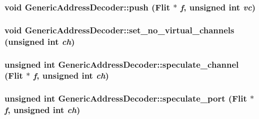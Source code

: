 \hypertarget{classGenericAddressDecoder_8a2cc1c7e48dbbf11b03c49a3ce3e1d9}{
\subsubsection[{push}]{\setlength{\rightskip}{0pt plus 5cm}void GenericAddressDecoder::push ({\bf Flit} $\ast$ {\em f}, \/  unsigned int {\em vc})}}
\label{classGenericAddressDecoder_8a2cc1c7e48dbbf11b03c49a3ce3e1d9}


\hypertarget{classGenericAddressDecoder_8473f733b74bc46dbcda7a5a4cdd4420}{
\subsubsection[{set\_\-no\_\-virtual\_\-channels}]{\setlength{\rightskip}{0pt plus 5cm}void GenericAddressDecoder::set\_\-no\_\-virtual\_\-channels (unsigned int {\em ch})}}
\label{classGenericAddressDecoder_8473f733b74bc46dbcda7a5a4cdd4420}


\hypertarget{classGenericAddressDecoder_81457cd722fd50e8297078e0729ea6b5}{
\subsubsection[{speculate\_\-channel}]{\setlength{\rightskip}{0pt plus 5cm}unsigned int GenericAddressDecoder::speculate\_\-channel ({\bf Flit} $\ast$ {\em f}, \/  unsigned int {\em ch})}}
\label{classGenericAddressDecoder_81457cd722fd50e8297078e0729ea6b5}


\hypertarget{classGenericAddressDecoder_d7d7f4cb63e720fd70d886eb6d11e812}{
\subsubsection[{speculate\_\-port}]{\setlength{\rightskip}{0pt plus 5cm}unsigned int GenericAddressDecoder::speculate\_\-port ({\bf Flit} $\ast$ {\em f}, \/  unsigned int {\em ch})}}
\label{classGenericAddressDecoder_d7d7f4cb63e720fd70d886eb6d11e812}


